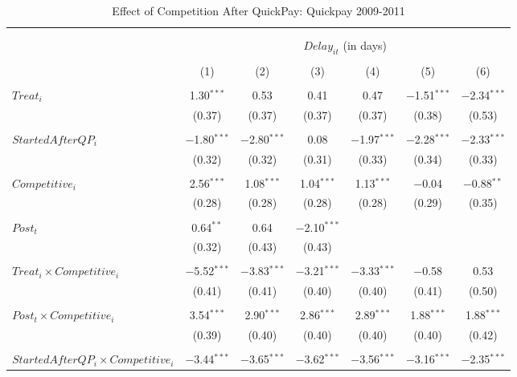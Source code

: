 \documentclass[
]{article}
\begin{document}
\begin{table}[H] \centering 
  \caption{Effect of Competition After QuickPay: Quickpay 2009-2011} 
  \label{} 
\small 
\begin{tabular}{@{\extracolsep{-3pt}}lcccccc} 
\\[-1.8ex]\hline 
\hline \\[-1.8ex] 
\\[-1.8ex] & \multicolumn{6}{c}{$Delay_{it}$ (in days)} \\ 
\\[-1.8ex] & (1) & (2) & (3) & (4) & (5) & (6)\\ 
\hline \\[-1.8ex] 
 $Treat_i$ & 1.30$^{***}$ & 0.53 & 0.41 & 0.47 & $-$1.51$^{***}$ & $-$2.34$^{***}$ \\ 
  & (0.37) & (0.37) & (0.37) & (0.37) & (0.38) & (0.53) \\ 
  & & & & & & \\ 
 $StartedAfterQP_i$ & $-$1.80$^{***}$ & $-$2.80$^{***}$ & 0.08 & $-$1.97$^{***}$ & $-$2.28$^{***}$ & $-$2.33$^{***}$ \\ 
  & (0.32) & (0.32) & (0.31) & (0.33) & (0.34) & (0.33) \\ 
  & & & & & & \\ 
 $Competitive_i$ & 2.56$^{***}$ & 1.08$^{***}$ & 1.04$^{***}$ & 1.13$^{***}$ & $-$0.04 & $-$0.88$^{**}$ \\ 
  & (0.28) & (0.28) & (0.28) & (0.28) & (0.29) & (0.35) \\ 
  & & & & & & \\ 
 $Post_t$ & 0.64$^{**}$ & 0.64 & $-$2.10$^{***}$ &  &  &  \\ 
  & (0.32) & (0.43) & (0.43) &  &  &  \\ 
  & & & & & & \\ 
 $Treat_i \times Competitive_i$ & $-$5.52$^{***}$ & $-$3.83$^{***}$ & $-$3.21$^{***}$ & $-$3.33$^{***}$ & $-$0.58 & 0.53 \\ 
  & (0.41) & (0.41) & (0.40) & (0.40) & (0.41) & (0.50) \\ 
  & & & & & & \\ 
 $Post_t \times Competitive_i$ & 3.54$^{***}$ & 2.90$^{***}$ & 2.86$^{***}$ & 2.89$^{***}$ & 1.88$^{***}$ & 1.88$^{***}$ \\ 
  & (0.39) & (0.40) & (0.40) & (0.40) & (0.40) & (0.42) \\ 
  & & & & & & \\ 
 $StartedAfterQP_i \times Competitive_i$ & $-$3.44$^{***}$ & $-$3.65$^{***}$ & $-$3.62$^{***}$ & $-$3.56$^{***}$ & $-$3.16$^{***}$ & $-$2.35$^{***}$ \\ 

\end{tabular}
\end{table}
\end{document}
